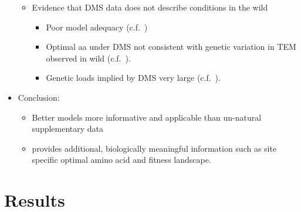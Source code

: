 \documentclass[12pt]{article}
\begin{document}
\begin{itemize}
\begin{itemize}
        \item Evidence that DMS data does not describe conditions in the wild
          \begin{itemize}
          \item Poor model adequacy (c.f.~\selac)
          \item Optimal aa under DMS not consistent with genetic variation in TEM observed in wild (c.f.~\selac).
          \item Genetic loads implied by DMS very large (c.f.~\selac).
          \end{itemize}
        \end{itemize}
      \item Conclusion:
        \begin{itemize}
        \item Better models more informative and applicable than un-natural supplementary data
        \item \selac provides additional, biologically meaningful information such as site specific optimal amino acid and fitness landscape.
        \end{itemize}
\end{itemize}

\section*{Results}
\end{document}
